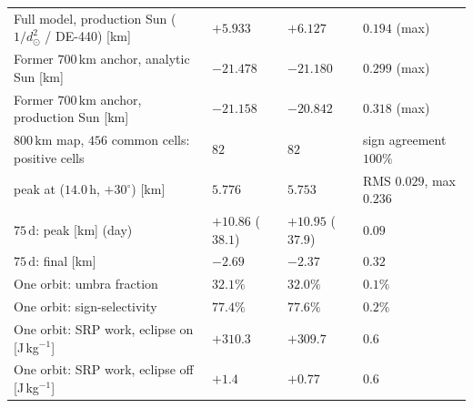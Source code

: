 \begin{table}[htbp]
\begin{tabular}{>{\raggedright\arraybackslash}p{5.0cm} >{\raggedright\arraybackslash}p{2.4cm} >{\raggedright\arraybackslash}p{2.4cm} >{\raggedright\arraybackslash}p{2.8cm}}
Full model, production Sun (\(1/d_{\odot}^2\) / DE-440) [km] & \(+5.933\) & \(+6.127\) & \(0.194\) (max) \\
Former \(700\,\mathrm{km}\) anchor, analytic Sun [km] & \(-21.478\) & \(-21.180\) & \(0.299\) (max) \\
Former \(700\,\mathrm{km}\) anchor, production Sun [km] & \(-21.158\) & \(-20.842\) & \(0.318\) (max) \\
\(800\,\mathrm{km}\) map, \(456\) common cells: positive cells & \(82\) & \(82\) & sign agreement \(100\%\) \\
\quad peak at (\(14.0\,\mathrm{h}\), \(+30^\circ\)) [km] & \(5.776\) & \(5.753\) & RMS \(0.029\), max \(0.236\) \\
\(75\,\mathrm{d}\): peak [km] (day) & \(+10.86\) (\(38.1\)) & \(+10.95\) (\(37.9\)) & \(0.09\) \\
\(75\,\mathrm{d}\): final [km] & \(-2.69\) & \(-2.37\) & \(0.32\) \\
One orbit: umbra fraction & \(32.1\%\) & \(32.0\%\) & \(0.1\%\) \\
One orbit: sign-selectivity & \(77.4\%\) & \(77.6\%\) & \(0.2\%\) \\
One orbit: SRP work, eclipse on [J\,kg\(^{-1}\)] & \(+310.3\) & \(+309.7\) & \(0.6\) \\
One orbit: SRP work, eclipse off [J\,kg\(^{-1}\)] & \(+1.4\) & \(+0.77\) & \(0.6\) \\
\bottomrule
\end{tabular}
\end{table}

